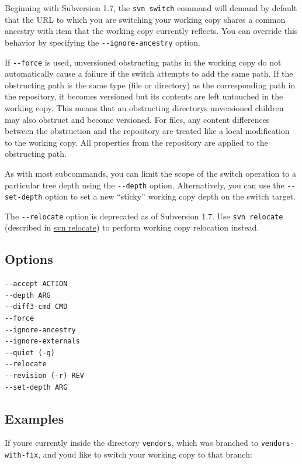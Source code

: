Beginning with Subversion 1.7, the \texttt{svn\ switch} command will
demand by default that the URL to which you are switching your working
copy shares a common ancestry with item that the working copy currently
reflects. You can override this behavior by specifying the
\texttt{-\/-ignore-ancestry} option.

If \texttt{-\/-force} is used, unversioned obstructing paths in the
working copy do not automatically cause a failure if the switch attempts
to add the same path. If the obstructing path is the same type (file or
directory) as the corresponding path in the repository, it becomes
versioned but its contents are left untouched in the working copy. This
means that an obstructing directory\textquotesingle s unversioned
children may also obstruct and become versioned. For files, any content
differences between the obstruction and the repository are treated like
a local modification to the working copy. All properties from the
repository are applied to the obstructing path.

As with most subcommands, you can limit the scope of the switch
operation to a particular tree depth using the \texttt{-\/-depth}
option. Alternatively, you can use the \texttt{-\/-set-depth} option to
set a new ``sticky'' working copy depth on the switch target.

The \texttt{-\/-relocate} option is deprecated as of Subversion 1.7. Use
\texttt{svn\ relocate} (described in
\hyperref[svn.ref.svn.c.relocate]{svn relocate}) to perform working copy
relocation instead.

\subsection{Options}

\begin{verbatim}
--accept ACTION
--depth ARG
--diff3-cmd CMD
--force
--ignore-ancestry
--ignore-externals
--quiet (-q)
--relocate
--revision (-r) REV
--set-depth ARG
\end{verbatim}

\subsection{Examples}

If you\textquotesingle re currently inside the directory
\texttt{vendors}, which was branched to \texttt{vendors-with-fix}, and
you\textquotesingle d like to switch your working copy to that branch:

